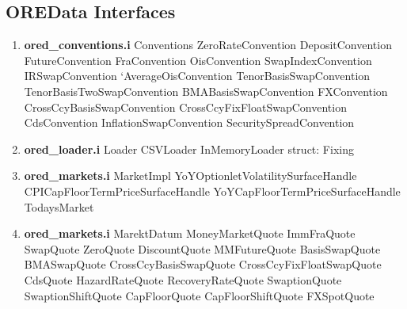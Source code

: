 \documentclass[10pt]{article}
\begin{document}
\subsection*{OREData Interfaces}
\begin{multicols}{2}
    \begin{enumerate}
            \item \textbf{ored\_conventions.i}
                \subitem Conventions
                \subitem ZeroRateConvention
                \subitem DepositConvention
                \subitem FutureConvention
                \subitem FraConvention
                \subitem OisConvention
                \subitem SwapIndexConvention
                \subitem IRSwapConvention
                \subitem`AverageOisConvention
                \subitem TenorBasisSwapConvention
                \subitem TenorBasisTwoSwapConvention
                \subitem BMABasisSwapConvention
                \subitem FXConvention
                \subitem CrossCcyBasisSwapConvention
                \subitem CrossCcyFixFloatSwapConvention
                \subitem CdsConvention
                \subitem InflationSwapConvention
                \subitem SecuritySpreadConvention
            \item \textbf{ored\_loader.i}
                \subitem Loader
                \subitem CSVLoader
                \subitem InMemoryLoader
                \subitem struct: Fixing
            \item \textbf{ored\_markets.i}
                \subitem MarketImpl
                \subitem YoYOptionletVolatilitySurfaceHandle
                \subitem CPICapFloorTermPriceSurfaceHandle
                \subitem YoYCapFloorTermPriceSurfaceHandle
                \subitem TodaysMarket
            \item \textbf{ored\_markets.i}
                \subitem MarektDatum
                \subitem MoneyMarketQuote
                \subitem ImmFraQuote
                \subitem SwapQuote
                \subitem ZeroQuote
                \subitem DiscountQuote
                \subitem MMFutureQuote
                \subitem BasisSwapQuote
                \subitem BMASwapQuote
                \subitem CrossCcyBasisSwapQuote
                \subitem CrossCcyFixFloatSwapQuote
                \subitem CdsQuote
                \subitem HazardRateQuote
                \subitem RecoveryRateQuote
                \subitem SwaptionQuote
                \subitem SwaptionShiftQuote
                \subitem CapFloorQuote
                \subitem CapFloorShiftQuote
                \subitem FXSpotQuote

\end{enumerate}
\end{multicols}
\end{document}
